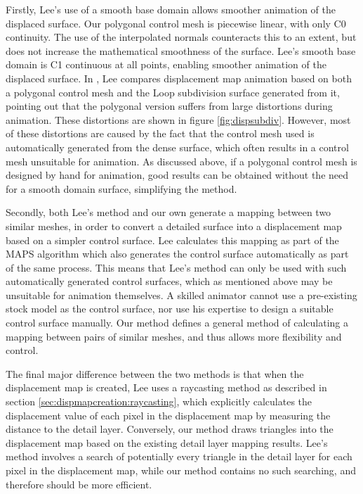 Firstly, Lee's use of a smooth base domain allows smoother animation of the displaced surface. Our polygonal control mesh is piecewise linear, with only C0 continuity. The use of the interpolated normals counteracts this to an extent, but does not increase the mathematical smoothness of the surface. Lee's smooth base domain is C1 continuous at all points, enabling smoother animation of the displaced surface. In \cite{Lee00}, Lee compares displacement map animation based on both a polygonal control mesh and the Loop subdivision surface generated from it, pointing out that the polygonal version suffers from large distortions during animation. These distortions are shown in figure \ref{fig:dispsubdiv}. However, most of these distortions are caused by the fact that the control mesh used is automatically generated from the dense surface, which often results in a control mesh unsuitable for animation. As discussed above, if a polygonal control mesh is designed by hand for animation, good results can be obtained without the need for a smooth domain surface, simplifying the method.

Secondly, both Lee's method and our own generate a mapping between two similar meshes, in order to convert a detailed surface into a displacement map based on a simpler control surface. Lee calculates this mapping as part of the MAPS algorithm \cite{Lee99} which also generates the control surface automatically as part of the same process. This means that Lee's method can only be used with such automatically generated control surfaces, which as mentioned above may be unsuitable for animation themselves. A skilled animator cannot use a pre-existing stock model as the control surface, nor use his expertise to design a suitable control surface manually. Our method defines a general method of calculating a mapping between pairs of similar meshes, and thus allows more flexibility and control.

The final major difference between the two methods is that when the displacement map is created, Lee uses a raycasting method as described in section \ref{sec:dispmapcreation:raycasting}, which explicitly calculates the displacement value of each pixel in the displacement map by measuring the distance to the detail layer. Conversely, our method draws triangles into the displacement map based on the existing detail layer mapping results. Lee's method involves a search of potentially every triangle in the detail layer for each pixel in the displacement map, while our method contains no such searching, and therefore should be more efficient.

